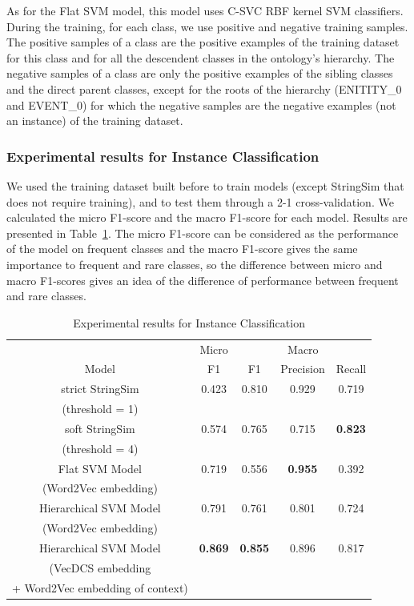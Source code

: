 \documentclass[twocolumn]{article}
\begin{document}
As for the Flat SVM model, this model uses C-SVC RBF kernel SVM classifiers. During the training, for each class, we use positive and negative training samples. The positive samples of a class are the positive examples of the training dataset for this class and for all the descendent classes in the ontology's hierarchy. The negative samples of a class are only the positive examples of the sibling classes and the direct parent classes, except for the roots of the hierarchy (ENITITY\_0 and EVENT\_0) for which the negative samples are the negative examples (not an instance) of the training dataset.

\subsubsection{Experimental results for Instance Classification}

We used the training dataset built before to train models (except StringSim that does not require training), and to test them through a 2-1 cross-validation.
We calculated the micro F1-score and the macro F1-score for each model. Results are presented in Table~\ref{resultsInstanceClassification}. The micro F1-score can be considered as the performance of the model on frequent classes and the macro F1-score gives the same importance to frequent and rare classes, so the difference between micro and macro F1-scores gives an idea of the difference of performance between frequent and rare classes.

\begin{table}[t]
\center
\begin{tabular}{c||c|c|c|c}
	 & Micro & \multicolumn{3}{c}{Macro} \\
	Model & F1 & F1 & Precision & Recall \\
	\hline
	\hline
	strict StringSim & 0.423 & 0.810 & 0.929 & 0.719\\
	(threshold = 1) & & & & \\ \hline
	soft StringSim & 0.574 & 0.765 & 0.715 & \textbf{0.823}\\
	(threshold = 4) & & & & \\ \hline
	Flat SVM Model & 0.719 & 0.556 & \textbf{0.955} & 0.392\\
	(Word2Vec embedding) & & & & \\ \hline
	Hierarchical SVM Model & 0.791 & 0.761 & 0.801 & 0.724\\
	(Word2Vec embedding) & & & & \\ \hline
	Hierarchical SVM Model & \textbf{0.869} & \textbf{0.855} & 0.896 & 0.817\\
	(VecDCS embedding & & & & \\
	+ Word2Vec embedding of context) & & & &
\end{tabular}
\caption{\label{resultsInstanceClassification} Experimental results for Instance Classification}
\end{table}
\end{document}
